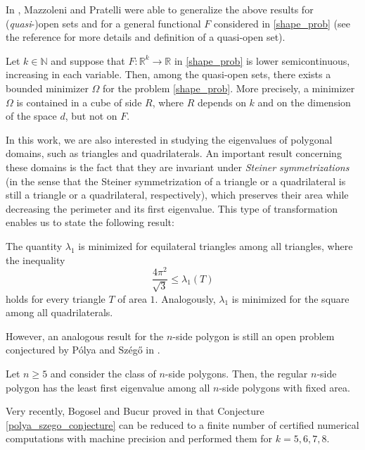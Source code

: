 In \cite{mazzoleni2013existence}, Mazzoleni and Pratelli were able to generalize the above results for (\textit{quasi}-)open sets and for a general functional \(F\) considered in \eqref{shape_prob} (see the reference for more details and definition of a quasi-open set).
\begin{theorem}
    Let \(k \in \mathbb{N}\) and suppose that \(F:\mathbb{R}^k \rightarrow \mathbb{R}\) in \eqref{shape_prob} is lower semicontinuous, increasing in each variable. Then, among the quasi-open sets, there exists a bounded minimizer \(\Omega\) for the problem \eqref{shape_prob}. More precisely, a minimizer \(\Omega\) is contained in a cube of side \(R\), where \(R\) depends on \(k\) and on the dimension of the space \(d\), but not on \(F\).
\end{theorem}

In this work, we are also interested in studying the eigenvalues of polygonal domains, such as triangles and quadrilaterals. An important result concerning these domains is the fact that they are invariant under \textit{Steiner symmetrizations} (in the sense that the Steiner symmetrization of a triangle or a quadrilateral is still a triangle or a quadrilateral, respectively), which preserves their area while decreasing the perimeter and its first eigenvalue. This type of transformation enables us to state the following result:

\begin{theorem}
    The quantity \(\lambda_1\) is minimized for equilateral triangles among all triangles, where the inequality
    \[
    \frac{4 \pi^2}{\sqrt{3}} \leq  \lambda_1(T)
    \]
    holds for every triangle \(T\) of area \(1\).
    Analogously, \(\lambda_1\) is minimized for the square among all quadrilaterals.
\end{theorem}

However, an analogous result for the \(n\)-side polygon is still an open problem conjectured by Pólya and Szég\H{o} in \cite{polya1951isoperimetric}.
\begin{conjecture}\label{polya_szego_conjecture}
    Let \(n \geq 5\) and consider the class of \(n\)-side polygons. Then, the regular \(n\)-side polygon has the least first eigenvalue among all \(n\)-side polygons with fixed area.
\end{conjecture}

Very recently, Bogosel and Bucur proved in \cite{bogosel2022polygonal} that Conjecture \eqref{polya_szego_conjecture} can be reduced to a finite number of certified numerical computations with machine precision and performed them for \(k=5, 6, 7, 8\).

